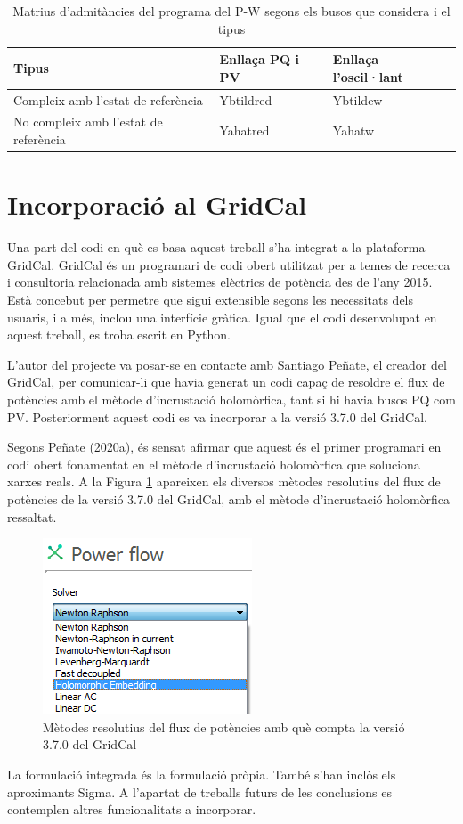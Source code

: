 \begin{table}[!htb]
  \begin{center}
  \begin{tabular}{lll}
  \hline
  Tipus & Enllaça PQ i PV & Enllaça l'oscil·lant\\
  \hline
  \hline
  Compleix amb l'estat de referència & Ybtildred & Ybtildew \\
  No compleix amb l'estat de referència & Yahatred & Yahatw \\
  \hline 
  \end{tabular}
  \caption{Matrius d'admitàncies del programa del P-W segons els busos que considera i el tipus}
  \label{tab:Fitxersmat2}
  \end{center}
\end{table}

\section{Incorporació al GridCal}
Una part del codi en què es basa aquest treball s'ha integrat a la plataforma GridCal. GridCal és un programari de codi obert utilitzat per a temes de recerca i consultoria relacionada amb sistemes elèctrics de potència des de l'any 2015. Està concebut per permetre que sigui extensible segons les necessitats dels usuaris, i a més, inclou una interfície gràfica. Igual que el codi desenvolupat en aquest treball, es troba escrit en Python.

L'autor del projecte va posar-se en contacte amb Santiago Peñate, el creador del GridCal, per comunicar-li que havia generat un codi capaç de resoldre el flux de potències amb el mètode d'incrustació holomòrfica, tant si hi havia busos PQ com PV. Posteriorment aquest codi es va incorporar a la versió 3.7.0 del GridCal. 

Segons Peñate (2020a), és sensat afirmar que aquest és el primer programari en codi obert fonamentat en el mètode d'incrustació holomòrfica que soluciona xarxes reals. A la Figura \ref{fig:solversGridCal} apareixen els diversos mètodes resolutius del flux de potències de la versió 3.7.0 del GridCal, amb el mètode d'incrustació holomòrfica ressaltat.

\begin{figure}[!htb] \footnotesize
  \begin{center}
\includegraphics[scale=1.0]{Inputs/solvers2}
\caption{Mètodes resolutius del flux de potències amb què compta la versió 3.7.0 del GridCal}
\label{fig:solversGridCal}
\end{center}
\end{figure}

La formulació integrada és la formulació pròpia. També s'han inclòs els aproximants Sigma. A l'apartat de treballs futurs de les conclusions es contemplen altres funcionalitats a incorporar.


